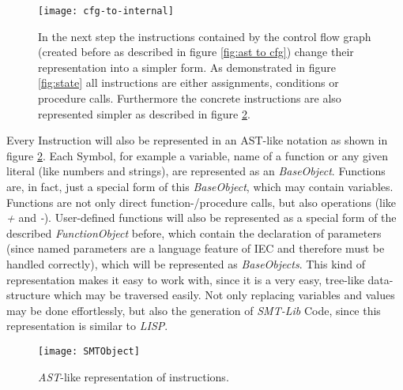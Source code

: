 \begin{figure}[h!]
	\centering
	\texttt{[image: cfg-to-internal]}
	\caption{In the next step the instructions contained by the control flow graph (created before as described in figure \ref{fig:ast to cfg}) change their representation into a simpler form. As demonstrated in figure \ref{fig:state} all instructions are either assignments, conditions or procedure calls. Furthermore the concrete instructions are also represented simpler as described in figure \ref{fig:smtobject}. }
	\label{fig:cfg to internal}
\end{figure}

Every Instruction will also be represented in an AST-like notation as shown in figure \ref{fig:smtobject}. Each Symbol, for example a variable, name of a function or any given literal (like numbers and strings), are represented as an \emph{BaseObject}. Functions are, in fact, just a special form of this \emph{BaseObject}, which may contain variables. Functions are not only direct function-/procedure calls, but also operations (like \emph{+} and \emph{-}). User-defined functions will also be represented as a special form of the described \emph{FunctionObject} before, which contain the declaration of parameters (since named parameters are a language feature of IEC and therefore must be handled correctly), which will be represented as \emph{BaseObjects}. 
This kind of representation makes it easy to work with, since it is a very easy, tree-like data-structure which may be traversed easily. Not only replacing variables and values may be done effortlessly, but also the generation of \emph{SMT-Lib} Code, since this representation is similar to \emph{LISP}.

\begin{figure}[h!]
	\centering
	\texttt{[image: SMTObject]}
	\caption{\emph{AST}-like representation of instructions. }
	\label{fig:smtobject}
\end{figure}
